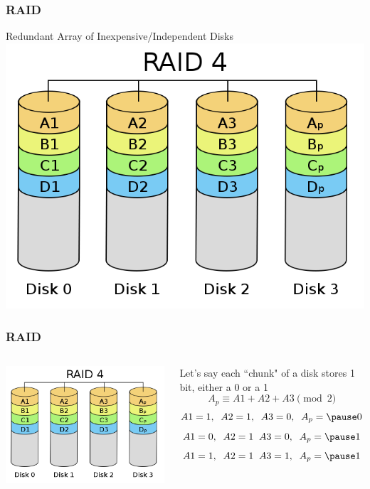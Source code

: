 \documentclass{beamer}
\theoremstyle{mystyle}
\begin{document}
\begin{frame}
\frametitle{RAID}

	\begin{center}
		Redundant Array of Inexpensive/Independent Disks
		\includegraphics[width=0.5\linewidth]{raid4}	
	\end{center}
\end{frame}


\begin{frame}
\frametitle{RAID}

\begin{columns}
		\begin{center}
			\vspace{-1in}
			\includegraphics[scale=0.15]{raid4}	
		\end{center}
		\begin{center}
		Let's say each ``chunk" of a disk stores 1 bit, either a 0 or a 1
		\pause
		\[A_p \equiv A1 + A2 + A3 \pmod 2\]
		\pause \[ A1 = 1, \; \; A2 = 1, \; \; A3 = 0, \;\;  A_p = \pause 0\]
		\pause \[ A1 = 0, \; \; A2 = 1 \;\; A3 = 0, \;\; A_p = \pause 1\]
		\pause \[ A1 = 1, \;\; A2 = 1 \;\; A3 = 1, \;\; A_p = \pause 1\]
		\end{center}
\end{columns}

\end{frame}
\end{document}

